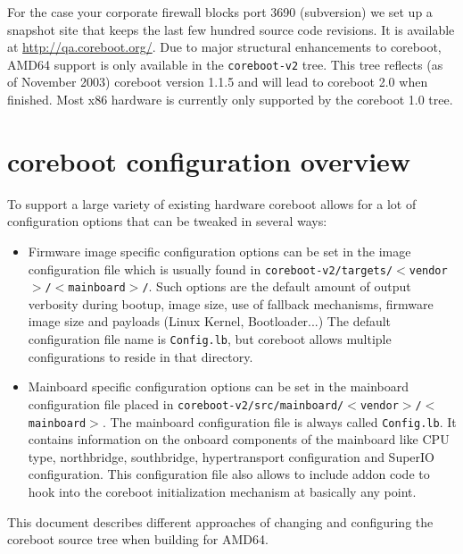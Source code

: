 \documentclass[titlepage,12pt]{article}
\begin{document}
For the case your corporate firewall blocks port 3690 (subversion) we set up a
snapshot site that keeps the last few hundred source code revisions. It
is available at \url{http://qa.coreboot.org/}.
Due to major structural enhancements to \hbox{coreboot}, AMD64 support
is only available in the \texttt{coreboot-v2} tree. This tree reflects (as
of November 2003) coreboot version 1.1.5 and will lead to coreboot 2.0
when finished.  Most x86 hardware is currently only supported by the
coreboot 1.0 tree.

%
%

\section{coreboot configuration overview}
To support a large variety of existing hardware coreboot allows for a
lot of configuration options that can be tweaked in several ways:

\begin{itemize}
\item
Firmware image specific configuration options can be set in the image
configuration file which is usually found in
\texttt{coreboot-v2/targets/$<$vendor$>$/$<$mainboard$>$/}.  Such
options are the default amount of output verbosity during bootup, image
size, use of fallback mechanisms, firmware image size and payloads
(Linux Kernel, Bootloader...) The default configuration file name is
\texttt{Config.lb}, but coreboot allows multiple configurations to
reside in that directory.

\item Mainboard specific configuration options can be set in the
mainboard configuration file placed in
\texttt{coreboot-v2/src/mainboard/$<$vendor$>$/$<$mainboard$>$}. The
mainboard configuration file is always called \texttt{Config.lb}. It
contains information on the onboard components of the mainboard like
CPU type, northbridge, southbridge, hypertransport configuration and
SuperIO configuration.  This configuration file also allows to include
addon code to hook into the coreboot initialization mechanism at
basically any point.

\end{itemize}

This document describes different approaches of changing and configuring the
coreboot source tree when building for AMD64.

%
%
\end{document}
